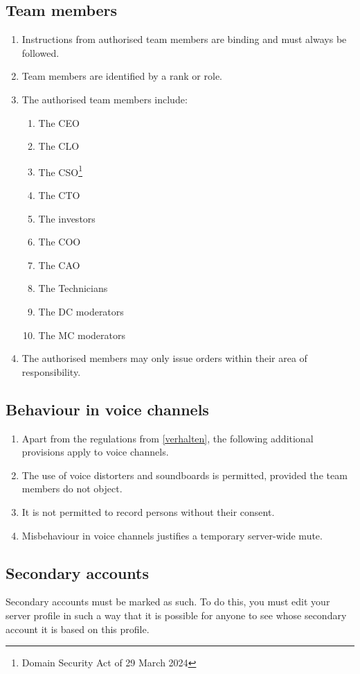 \documentclass{article}
\begin{document}
\subsection{Team members}\label{members}
\begin{enumerate}[(1)]
	\item Instructions from authorised team members are binding and must always be followed.
	\item Team members are identified by a rank or role.
	\item The authorised team members include:
	\begin{enumerate}
		\item The CEO
		\item The CLO
		\item The CSO\footnote{Domain Security Act of 29 March 2024}
		\item The CTO
		\item The investors
		\item The COO
		\item The CAO
		\item The Technicians
		\item The DC moderators
		\item The MC moderators
	\end{enumerate}
	\item The authorised members may only issue orders within their area of responsibility.
\end{enumerate}

\subsection{Behaviour in voice channels}
\begin{enumerate}[(1)]
	\item Apart from the regulations from \ref{verhalten}, the following additional provisions apply to voice channels.
	\item The use of voice distorters and soundboards is permitted, provided the team members do not object.
	\item It is not permitted to record persons without their consent.
	\item Misbehaviour in voice channels justifies a temporary server-wide mute.
\end{enumerate}

\subsection{Secondary accounts}
Secondary accounts must be marked as such. To do this, you must edit your server profile in such a way that it is possible for anyone to see whose secondary account it is based on this profile.
\end{document}
